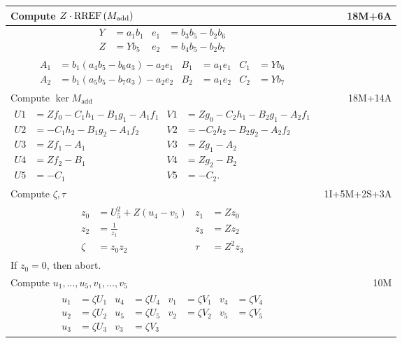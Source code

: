 \pagebreak
\begin{tabularx}{\linewidth}{|Xr|}
  \hline
  Compute $Z \cdot \operatorname{RREF}\left(M_{\text{add}}\right)$ & 18M+6A \\
  \hline
  {\begin{align*}
    Y &= a_1b_1 & e_1 &= b_3b_5 - b_2b_6 \\
    Z &= Yb_5   & e_2 &= b_4b_5 - b_2b_7
  \end{align*}} & \\
  {\begin{align*}
    A_1 &= b_1(a_4b_5 - b_6a_3) - a_2e_1 & B_1 &= a_1e_1 & C_1 &= Yb_6 \\
    A_2 &= b_1(a_5b_5 - b_7a_3) - a_2e_2 & B_2 &= a_1e_2 & C_2 &= Yb_7
  \end{align*}} & \\
  \hline
    Compute $\ker M_{\text{add}}$ & 18M+14A \\
  \hline
  {\begin{align*}
    U1 &= Zf_0 - C_1h_1 - B_1g_1 - A_1f_1 & V1 &= Zg_0 - C_2h_1 - B_2g_1 - A_2f_1 \\
    U2 &=      - C_1h_2 - B_1g_2 - A_1f_2 & V2 &=      - C_2h_2 - B_2g_2 - A_2f_2 \\
    U3 &= Zf_1 - A_1 & V3 &= Zg_1 - A_2 \\
    U4 &= Zf_2 - B_1 & V4 &= Zg_2 - B_2 \\
    U5 &=      - C_1 & V5 &=      - C_2.
  \end{align*}} & \\
  \hline
    Compute $\zeta, \tau$ & 1I+5M+2S+3A \\
  \hline
  {\begin{align*}
    z_0 &= U_5^2 + Z(u_4 - v_5) & z_1 &= Zz_0 \\
    z_2 &= \frac 1 {z_1} & z_3 &= Zz_2 \\
    \zeta &= z_0z_2 & \tau  &= Z^2z_3
  \end{align*}} & \\
  If $z_0 = 0$, then abort. & \\
  \hline
    Compute $u_1, \ldots, u_5, v_1, \ldots, v_5$ & 10M \\
  \hline
  {\begin{align*}
    u_1 &= \zeta U_1 & u_4 &= \zeta U_4 & v_1 &= \zeta V_1 & v_4 &= \zeta V_4 \\
    u_2 &= \zeta U_2 & u_5 &= \zeta U_5 & v_2 &= \zeta V_2 & v_5 &= \zeta V_5 \\
    u_3 &= \zeta U_3                    & v_3 &= \zeta V_3
  \end{align*}} & \\
  \hline
\end{tabularx}


